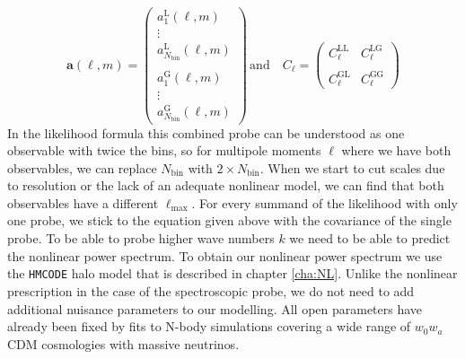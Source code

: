 \documentclass[../main.tex]{subfiles}
\begin{document}
 \begin{equation}
    \boldsymbol{a}(\ell,m) =  \left(\begin{array}{c}
        a^\mathrm{L}_1 (\ell,m) \\
        \vdots \\
        a^\mathrm{L}_{N_\mathrm{bin}}(\ell,m)\\\\
        a^\mathrm{G}_1(\ell,m) \\
        \vdots \\
        a^\mathrm{G}_{N_\mathrm{bin}}(\ell,m)
    \end{array}\right)\,\text{and}\quad C_\ell = \left(\begin{array}{cc}
        C^\mathrm{LL}_\ell &  C^\mathrm{LG}_\ell\\\\
        C^\mathrm{GL}_\ell & C^\mathrm{GG}_\ell
    \end{array} \right)
 \end{equation}
 In the likelihood formula this combined probe can be understood as one observable with twice the bins, so for multipole moments $\ell$ where we have both observables, we can replace $N_\mathrm{bin}$ with $2\times N_\mathrm{bin}$. When we start to cut scales due to resolution or the lack of an adequate nonlinear model, we can find that both observables have a different $\ell_\mathrm{max}$. For every summand of the likelihood with only one probe, we stick to the equation given above with the covariance of the single probe. 
 To be able to probe higher wave numbers $k$ we need to be able to predict the nonlinear power spectrum. To obtain our nonlinear power spectrum we use the {\tt HMCODE} halo model that is described in chapter \ref{cha:NL}. Unlike the nonlinear prescription in the case of the spectroscopic probe, we do not need to add additional nuisance parameters to our modelling. All open parameters have already been fixed by fits to N-body simulations covering a wide range of $w_0w_a$CDM cosmologies with massive neutrinos.
\end{document}
